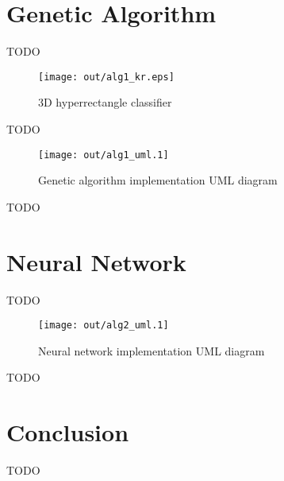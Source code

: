 \documentclass[a4paper]{article}
\title{\DOCTITLE}
\author{\DOCAUTHOR}
\date{\DOCDATE}
\begin{document}
\maketitle

\begin{abstract}
  This report will give an overview of the two nature inspired algorithms that
  were implemented to solve the classification problem, how they differ from
  what was outlined in the proposal and a critical evaluation between the
  performance of both in terms of learning time and classification accuracy.
\end{abstract}

\section{Genetic Algorithm}

TODO

\begin{figure}[h!]
  \centering
  \texttt{[image: out/alg1\_kr.eps]}
  \caption{3D hyperrectangle classifier}
  \label{fig:alg1_kr}
\end{figure}

TODO

\begin{figure}[h!]
  \centering
  \texttt{[image: out/alg1\_uml.1]}
  \caption{Genetic algorithm implementation UML diagram}
  \label{fig:alg1_uml}
\end{figure}

TODO

\section{Neural Network}

TODO

\begin{figure}[h!]
  \centering
  \texttt{[image: out/alg2\_uml.1]}
  \caption{Neural network implementation UML diagram}
  \label{fig:alg2_uml}
\end{figure}

TODO

\section{Conclusion}

TODO

\end{document}
